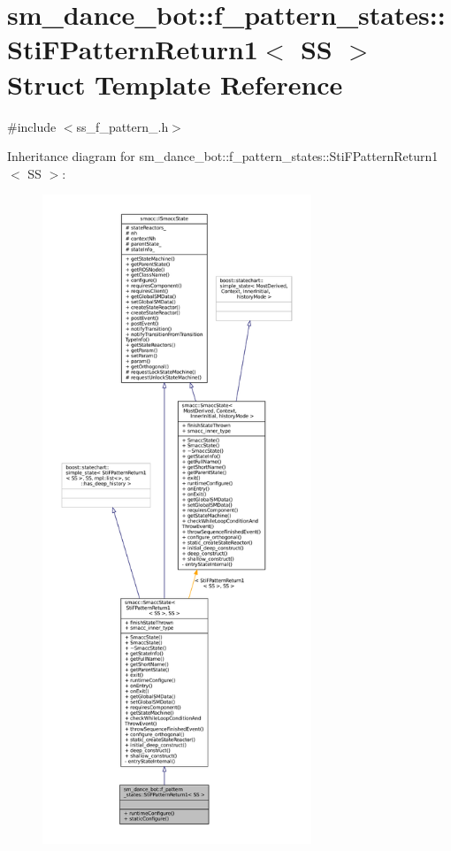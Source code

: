 \hypertarget{classsm__dance__bot_1_1f__pattern__states_1_1StiFPatternReturn1}{}\section{sm\+\_\+dance\+\_\+bot\+:\+:f\+\_\+pattern\+\_\+states\+:\+:Sti\+F\+Pattern\+Return1$<$ SS $>$ Struct Template Reference}
\label{classsm__dance__bot_1_1f__pattern__states_1_1StiFPatternReturn1}


{\ttfamily \#include $<$ss\+\_\+f\+\_\+pattern\+\_.\+h$>$}



Inheritance diagram for sm\+\_\+dance\+\_\+bot\+:\+:f\+\_\+pattern\+\_\+states\+:\+:Sti\+F\+Pattern\+Return1$<$ SS $>$\+:
\nopagebreak
\begin{figure}[H]
\begin{center}
\leavevmode
\includegraphics[height=550pt]{classsm__dance__bot_1_1f__pattern__states_1_1StiFPatternReturn1__inherit__graph}
\end{center}
\end{figure}


